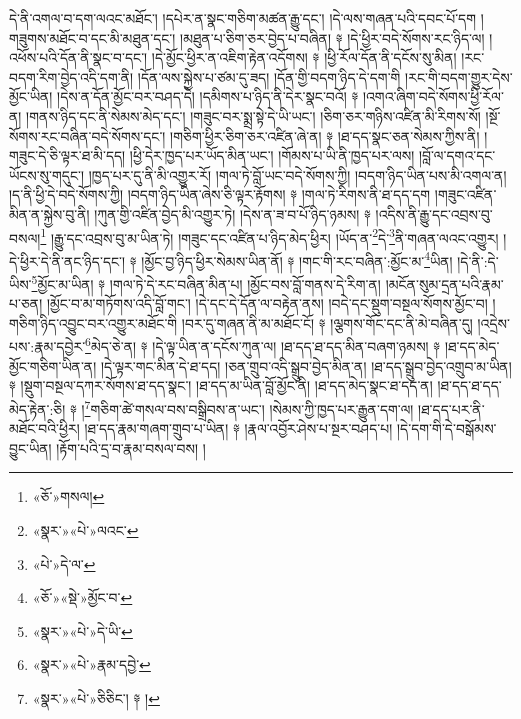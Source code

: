 དེ་ནི་འགལ་བ་དག་ལའང་མཐོང་། །དཔེར་ན་སྣང་གཅིག་མཚན་རྒྱུ་དང་། །དེ་ལས་གཞན་པའི་དབང་པོ་དག །གཟུགས་མཐོང་བ་དང་མི་མཐུན་དང་། །མཐུན་པ་ཅིག་ཅར་བྱེད་པ་བཞིན། ༈ །དེ་ཕྱིར་བདེ་སོགས་རང་ཉིད་ལ། །འཕོས་པའི་དོན་ནི་སྣང་བ་དང་། །དེ་མྱོང་ཕྱིར་ན་འཇིག་རྟེན་འདོགས། ༈ །ཕྱི་རོལ་དོན་ནི་དངོས་སུ་མིན། །རང་བདག་རིག་བྱེད་འདི་དག་ནི། །དོན་ལས་སྐྱེས་པ་ཙམ་དུ་ཟད། །དོན་གྱི་བདག་ཉིད་དེ་དག་གི །རང་གི་བདག་གྱུར་དེས་མྱོང་ཡིན། །དེས་ན་དོན་མྱོང་བར་བཤད་དེ། །དམིགས་པ་ཉིད་ནི་དེར་སྣང་བའོ། ༈ །འགའ་ཞིག་བདེ་སོགས་ཕྱི་རོལ་ན། །གནས་ཉིད་དང་ནི་སེམས་མེད་དང་། །གཟུང་བར་སྨྲ་སྟེ་དེ་ཡི་ཡང་། །ཅིག་ཅར་གཉིས་འཛིན་མི་རིགས་སོ། །སྔོ་སོགས་རང་བཞིན་བདེ་སོགས་དང་། །གཅིག་ཕྱིར་ཅིག་ཅར་འཛིན་ཞེ་ན། ༈ །ཐ་དད་སྣང་ཅན་སེམས་ཀྱིས་ནི། །གཟུང་དེ་ཅི་ལྟར་ཐ་མི་དད། །ཕྱི་དེར་ཁྱད་པར་ཡོད་མིན་ཡང་། །གོམས་པ་ཡི་ནི་ཁྱད་པར་ལས། །བློ་ལ་དགའ་དང་ཡོངས་སུ་གདུང་། །ཁྱད་པར་དུ་ནི་མི་འགྱུར་རོ། །གལ་ཏེ་བློ་ཡང་བདེ་སོགས་ཀྱི། །བདག་ཉིད་ཡིན་པས་མི་འགལ་ན། །ད་ནི་ཕྱི་དེ་བདེ་སོགས་ཀྱི། །བདག་ཉིད་ཡིན་ཞེས་ཅི་ལྟར་རྟོགས། ༈ །གལ་ཏེ་རིགས་ནི་ཐ་དད་དག །གཟུང་འཛིན་མིན་ན་སྐྱེས་བུ་ནི། །ཀུན་གྱི་འཛིན་བྱེད་མི་འགྱུར་ཏེ། །དེས་ན་ཟ་བ་པོ་ཉིད་ཉམས། ༈ །འདིས་ནི་རྒྱུ་དང་འབྲས་བུ་བསལ།\footnote{«ཅོ་»གསལ།} །རྒྱུ་དང་འབྲས་བུ་མ་ཡིན་ཏེ། །གཟུང་དང་འཛིན་པ་ཉིད་མེད་ཕྱིར། །ཡོད་ན་\footnote{«སྣར་»«པེ་»ལའང་}དེ་\footnote{«པེ་»དེ་ལ་}ནི་གཞན་ལའང་འགྱུར། །དེ་ཕྱིར་དེ་ནི་ནང་ཉིད་དང་། ༈ །མྱོང་བྱ་ཉིད་ཕྱིར་སེམས་ཡིན་ནོ། ༈ །གང་གི་རང་བཞིན་:མྱོང་མ་\footnote{«ཅོ་»«སྡེ་»མྱོང་བ་}ཡིན། །དེ་ནི་:དེ་ཡིས་\footnote{«སྣར་»«པེ་»དེ་ཡི་}མྱོང་མ་ཡིན། ༈ །གལ་ཏེ་དེ་རང་བཞིན་མིན་པ། །མྱོང་བས་བློ་གནས་དེ་རིག་ན། །མངོན་སུམ་དྲན་པའི་རྣམ་པ་ཅན། །མྱོང་བ་མ་གཏོགས་འདི་བློ་གང་། །དེ་དང་དེ་དོན་ལ་བརྟེན་ནས། །བདེ་དང་སྡུག་བསྔལ་སོགས་མྱོང་བ། །གཅིག་ཉིད་འབྱུང་བར་འགྱུར་མཐོང་གི །བར་དུ་གཞན་ནི་མ་མཐོང་ངོ། ༈ །ལྕགས་གོང་དང་ནི་མེ་བཞིན་དུ། །འདྲེས་པས་:རྣམ་དབྱེར་\footnote{«སྣར་»«པེ་»རྣམ་དབྱེ་}མེད་ཅེ་ན། ༈ །དེ་ལྟ་ཡིན་ན་དངོས་ཀུན་ལ། །ཐ་དད་ཐ་དད་མིན་བཞག་ཉམས། ༈ །ཐ་དད་མེད་མྱོང་གཅིག་ཡིན་ན། །དེ་ལྟར་གང་མིན་དེ་ཐ་དད། །ཅན་གྲུབ་འདི་སྒྲུབ་བྱེད་མིན་ན། །ཐ་དད་སྒྲུབ་བྱེད་འགྲུབ་མ་ཡིན། ༈ །སྡུག་བསྔལ་དཀར་སོགས་ཐ་དད་སྣང་། །ཐ་དད་མ་ཡིན་བློ་མྱོང་ནི། །ཐ་དད་མེད་སྣང་ཐ་དད་ན། །ཐ་དད་ཐ་དད་མེད་རྟེན་:ཅི། ༈ །\footnote{«སྣར་»«པེ་»ཅིཅིང་། ༈ །}གཅིག་ཚེ་གསལ་བས་བསྒྲིབས་ན་ཡང་། །སེམས་ཀྱི་ཁྱད་པར་རྒྱུན་དག་ལ། །ཐ་དད་པར་ནི་མཐོང་བའི་ཕྱིར། །ཐ་དད་རྣམ་གཞག་གྲུབ་པ་ཡིན། ༈ །རྣལ་འབྱོར་ཤེས་པ་སྔར་བཤད་པ། །དེ་དག་གི་དེ་བསྒོམས་བྱུང་ཡིན། །རྟོག་པའི་དྲ་བ་རྣམ་བསལ་བས། །
